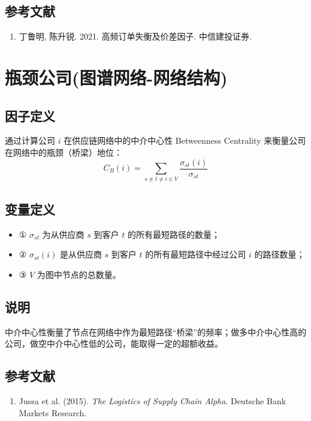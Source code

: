 \documentclass{article}
\begin{document}
\subsection{参考文献}
\begin{enumerate}
    \item 丁鲁明, 陈升锐. 2021. 高频订单失衡及价差因子. 中信建投证券.
\end{enumerate}

\section{瓶颈公司(图谱网络-网络结构)}

\subsection{因子定义}
通过计算公司 \( i \) 在供应链网络中的中介中心性 Betweenness Centrality 来衡量公司在网络中的瓶颈（桥梁）地位：
\begin{equation}
    C_B(i) = \sum_{s \neq t \neq i \in V} \frac{\sigma_{st}(i)}{\sigma_{st}}
\end{equation}

\subsection{变量定义}
\begin{itemize}
    \item ① \( \sigma_{st} \) 为从供应商 \( s \) 到客户 \( t \) 的所有最短路径的数量；
    \item ② \( \sigma_{st}(i) \) 是从供应商 \( s \) 到客户 \( t \) 的所有最短路径中经过公司 \( i \) 的路径数量；
    \item ③ \( V \) 为图中节点的总数量。
\end{itemize}

\subsection{说明}
中介中心性衡量了节点在网络中作为最短路径“桥梁”的频率；做多中介中心性高的公司，做空中介中心性低的公司，能取得一定的超额收益。

\subsection{参考文献}
\begin{enumerate}
    \item Jussa et al. (2015). \textit{The Logistics of Supply Chain Alpha}. Deutsche Bank Markets Research.
\end{enumerate}
\end{document}
